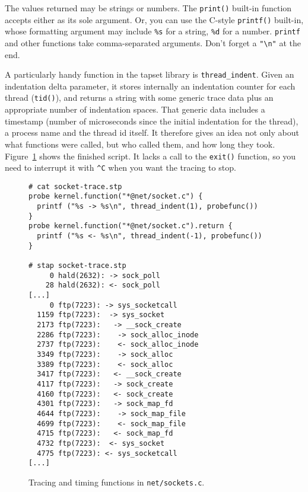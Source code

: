 \documentclass{article}
\newenvironment{boxedminipage}%
    {\begin{makeimage}\begin{center}\begin{Sbox}\begin{minipage}}%
    {\end{minipage}\end{Sbox}\fbox{\TheSbox}\end{center}\end{makeimage}}
\begin{document}
The values returned may be strings or numbers.  The \verb+print()+
built-in function accepts either as its sole argument.  Or, you can
use the C-style \verb+printf()+ built-in, whose formatting argument
may include \verb+%s+ for a string, \verb+%d+ for a number.
\verb+printf+ and other functions take comma-separated arguments.
Don't forget a \verb+"\n"+ at the end.

A particularly handy function in the tapset library is
\verb+thread_indent+.  Given an indentation delta parameter, it stores
internally an indentation counter for each thread (\verb+tid()+), and
returns a string with some generic trace data plus an appropriate
number of indentation spaces.  That generic data includes a timestamp
(number of microseconds since the initial indentation for the thread), a
process name and the thread id itself.  It therefore gives an idea not
only about what functions were called, but who called them, and how
long they took.  Figure~\ref{fig:socket-trace} shows the finished
script.  It lacks a call to the \verb+exit()+ function, so you need to
interrupt it with \verb+^C+ when you want the tracing to stop.

\begin{figure}[!ht]
\begin{boxedminipage}{4.5in}
\begin{verbatim}
# cat socket-trace.stp
probe kernel.function("*@net/socket.c") {
  printf ("%s -> %s\n", thread_indent(1), probefunc())
}
probe kernel.function("*@net/socket.c").return {
  printf ("%s <- %s\n", thread_indent(-1), probefunc())
}

# stap socket-trace.stp
     0 hald(2632): -> sock_poll
    28 hald(2632): <- sock_poll
[...]
     0 ftp(7223): -> sys_socketcall
  1159 ftp(7223):  -> sys_socket
  2173 ftp(7223):   -> __sock_create
  2286 ftp(7223):    -> sock_alloc_inode
  2737 ftp(7223):    <- sock_alloc_inode
  3349 ftp(7223):    -> sock_alloc
  3389 ftp(7223):    <- sock_alloc
  3417 ftp(7223):   <- __sock_create
  4117 ftp(7223):   -> sock_create
  4160 ftp(7223):   <- sock_create
  4301 ftp(7223):   -> sock_map_fd
  4644 ftp(7223):    -> sock_map_file
  4699 ftp(7223):    <- sock_map_file
  4715 ftp(7223):   <- sock_map_fd
  4732 ftp(7223):  <- sys_socket
  4775 ftp(7223): <- sys_socketcall
[...]
\end{verbatim}
\end{boxedminipage}
\caption{Tracing and timing functions in {\tt net/sockets.c}.}
\label{fig:socket-trace}
\end{figure}
\end{document}

